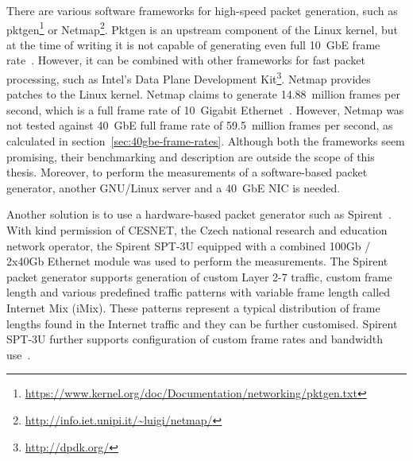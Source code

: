 There are various software frameworks for high-speed packet generation,
such as pktgen\footnote{\url{https://www.kernel.org/doc/Documentation/networking/pktgen.txt}}
or Netmap\footnote{\url{http://info.iet.unipi.it/~luigi/netmap/}}.
Pktgen is an upstream component of the Linux kernel, but
at the time of writing it is not capable of generating even full 10~GbE frame rate~\cite{netmap}.
However, it can be combined with other frameworks for fast packet processing, such as
Intel's Data Plane Development Kit\footnote{\url{http://dpdk.org/}}.
Netmap provides patches to the Linux kernel.
Netmap claims to generate 14.88~million frames per second, which is a full frame rate of 10~Gigabit Ethernet~\cite{netmap}.
However, Netmap was not tested against 40~GbE full frame rate of 59.5~million frames per second,
as calculated in section~\ref{sec:40gbe-frame-rates}.
Although both the frameworks seem promising, their benchmarking and description
are outside the scope of this thesis.
Moreover, to perform the measurements of a software-based packet generator,
another GNU/Linux server and a 40~GbE NIC is needed.

Another solution is to use a hardware-based packet generator such as Spirent~\cite{spirent}.
With kind permission of CESNET, the Czech national research and education network operator,
the Spirent SPT-3U equipped with a combined 100Gb / 2x40Gb Ethernet module was used to perform the measurements.
The Spirent packet generator supports generation of custom Layer 2-7 traffic, custom frame length and various
predefined traffic patterns with variable frame length called Internet Mix (iMix).
These patterns represent a typical distribution of frame lengths found in the Internet traffic
and they can be further customised.
Spirent SPT-3U further supports configuration of custom frame rates and bandwidth use~\cite{spirent}.
